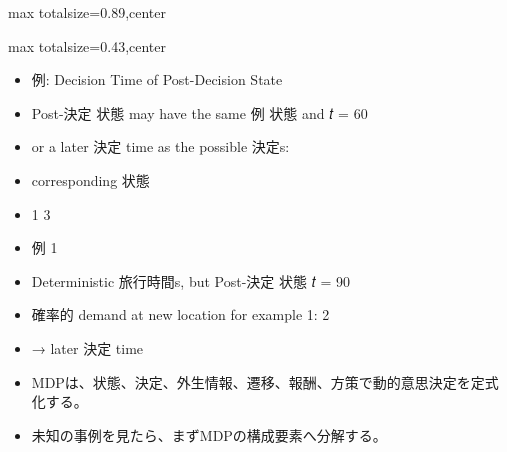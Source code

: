 \begin{minipage}[t]{0.58\textwidth}
\begin{adjustbox}{max totalsize={\textwidth}{0.89\textheight},center}
\begin{minipage}{\textwidth}
\end{minipage}
\end{adjustbox}
\end{minipage}


\clearpage
{}
\begin{minipage}[t]{0.405\textwidth}
\begin{adjustbox}{max totalsize={\textwidth}{0.43\textheight},center}
\begin{minipage}{\textwidth}\scriptsize
{}\begin{itemize}
\item 例: Decision Time of Post-Decision State
\item Post-決定 状態 may have the same 例 状態 and 𝑡 = 60
\item or a later 決定 time as the possible 決定s:
\item corresponding 状態
\item 1 3
\item 例 1
\item Deterministic 旅行時間s, but Post-決定 状態 𝑡 = 90
\item 確率的 demand at new location for example 1: 2
\item → later 決定 time
\end{itemize}\begin{itemize}
\item MDPは、状態、決定、外生情報、遷移、報酬、方策で動的意思決定を定式化する。
\item 未知の事例を見たら、まずMDPの構成要素へ分解する。
\end{itemize}
\end{minipage}
\end{adjustbox}
\end{minipage}\hfill
